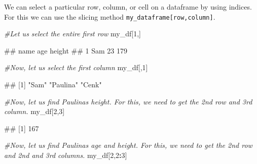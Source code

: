 \documentclass[
]{book}
\newenvironment{Shaded}{\begin{snugshade}}{\end{snugshade}}
\newcommand{\CommentTok}[1]{\textcolor[rgb]{0.56,0.35,0.01}{\textit{#1}}}
\newcommand{\DecValTok}[1]{\textcolor[rgb]{0.00,0.00,0.81}{#1}}
\newcommand{\NormalTok}[1]{#1}
\newcommand{\SpecialCharTok}[1]{\textcolor[rgb]{0.81,0.36,0.00}{\textbf{#1}}}
\begin{document}
We can select a particular row, column, or cell on a dataframe by using indices. For this we can use the slicing method \texttt{my\_dataframe{[}row,column{]}}.

\begin{Shaded}
\begin{Highlighting}[]
\CommentTok{\#Let us select the entire first row }
\NormalTok{my\_df[}\DecValTok{1}\NormalTok{,]}
\end{Highlighting}
\end{Shaded}

\begin{Shaded}
\begin{Highlighting}[]
\NormalTok{\#\#   name age height}
\NormalTok{\#\# 1  Sam  23    179}
\end{Highlighting}
\end{Shaded}

\begin{Shaded}
\begin{Highlighting}[]
\CommentTok{\#Now, let us select the first column }
\NormalTok{my\_df[,}\DecValTok{1}\NormalTok{]}
\end{Highlighting}
\end{Shaded}

\begin{Shaded}
\begin{Highlighting}[]
\NormalTok{\#\# [1] "Sam"     "Paulina" "Cenk"}
\end{Highlighting}
\end{Shaded}

\begin{Shaded}
\begin{Highlighting}[]
\CommentTok{\#Now, let us find Paulina\textquotesingle{}s height. For this, we need to get the 2nd row and 3rd column.}
\NormalTok{my\_df[}\DecValTok{2}\NormalTok{,}\DecValTok{3}\NormalTok{]}
\end{Highlighting}
\end{Shaded}

\begin{Shaded}
\begin{Highlighting}[]
\NormalTok{\#\# [1] 167}
\end{Highlighting}
\end{Shaded}

\begin{Shaded}
\begin{Highlighting}[]
\CommentTok{\#Now, let us find Paulina\textquotesingle{}s age and height. For this, we need to get the 2nd row and 2nd and 3rd columns.}
\NormalTok{my\_df[}\DecValTok{2}\NormalTok{,}\DecValTok{2}\SpecialCharTok{:}\DecValTok{3}\NormalTok{]}
\end{Highlighting}
\end{Shaded}
\end{document}
